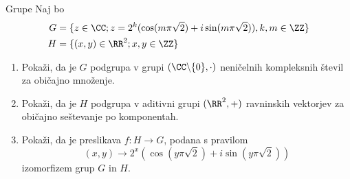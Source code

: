 \begin{frame}{Grupe}
	Naj bo
	\begin{align*}
		G & = \{ z \in \CC ; z = 2^k (\cos(m\pi \sqrt{2}) + i \sin (m\pi \sqrt{2})), k,m \in \ZZ \} \\
		H & = \{ (x,y) \in \RR^2; x, y \in \ZZ \} \\
	\end{align*}
	
		\begin{enumerate}
		\item
			Pokaži, da je $G$ podgrupa v grupi $(\CC \backslash \{0\}, \cdot)$
			neničelnih kompleksnih števil za običajno množenje.
		\item
			Pokaži, da je $H$ podgrupa v aditivni grupi $(\RR^2 , +)$
			ravninskih vektorjev za običajno seštevanje po komponentah.
		\item
			Pokaži, da je preslikava $f:H\to G$, podana s pravilom
			$$ (x,y) \rightarrow 2^x(\cos(y\pi \sqrt{2})+ i \sin(y\pi \sqrt{2})) $$
			izomorfizem grup $G$ in $H$.
	\end{enumerate}
\end{frame}

